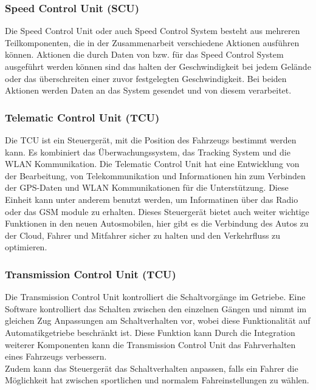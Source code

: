         \subsubsection{Speed Control Unit (SCU)}
        Die Speed Control Unit oder auch Speed Control System besteht aus mehreren Teilkomponenten, die in der Zusammenarbeit
        verschiedene Aktionen ausführen können. Aktionen die durch Daten von bzw. für das Speed Control System ausgeführt
        werden können sind das halten der Geschwindigkeit bei jedem Gelände oder das überschreiten einer zuvor festgelegten
        Geschwindigkeit. Bei beiden Aktionen werden Daten an das System gesendet und von diesem verarbeitet.

        \subsubsection{Telematic Control Unit (TCU)}
        Die TCU ist ein Steuergerät, mit die Position des Fahrzeugs bestimmt werden kann. Es kombiniert das Überwachungssystem,
        das Tracking System und die WLAN Kommunikation. Die Telematic Control Unit hat eine Entwicklung von der Bearbeitung, von
        Telekommunikation und Informationen hin zum Verbinden der GPS-Daten und WLAN Kommunikationen für die Unterstützung.
        Diese Einheit kann unter anderem benutzt werden, um Informatinen über das Radio oder das GSM module zu erhalten.
        Dieses Steuergerät bietet auch weiter wichtige Funktionen in den neuen Autosmobilen, hier gibt es die Verbindung
        des Autos zu der Cloud, Fahrer und Mitfahrer sicher zu halten und den Verkehrfluss zu optimieren.

        \subsubsection{Transmission Control Unit (TCU)}
        Die Transmission Control Unit kontrolliert die Schaltvorgänge im Getriebe. Eine Software kontrolliert das Schalten
        zwischen den einzelnen Gängen und nimmt im gleichen Zug Anpassungen am Schaltverhalten vor, wobei diese Funktionalität auf Automatikgetriebe beschränkt ist. Diese Funktion kann
        Durch die Integration weiterer Komponenten kann die Transmission Control Unit das Fahrverhalten eines Fahrzeugs verbessern.\\
        Zudem kann das Steuergerät das Schaltverhalten anpassen, falls ein Fahrer die Möglichkeit hat zwischen sportlichen und normalem Fahreinstellungen zu wählen.

